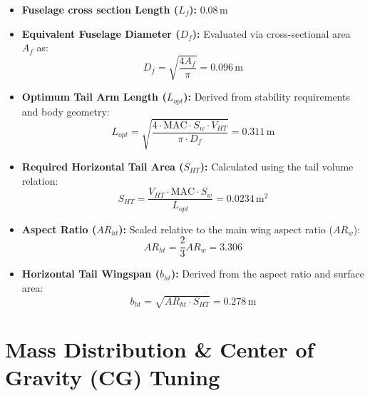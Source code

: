 \documentclass[11pt,a4paper]{article}
\begin{document}
\begin{itemize}
    \item \textbf{Fuselage cross section Length ($L_f$):} $0.08\,\text{m}$
    \item \textbf{Equivalent Fuselage Diameter ($D_f$):} Evaluated via cross-sectional area $A_f$ as:
    \begin{equation}
        D_f = \sqrt{\frac{4 A_f}{\pi}} = 0.096\,\text{m}
    \end{equation}
    \item \textbf{Optimum Tail Arm Length ($L_{opt}$):} Derived from stability requirements and body geometry:
    \begin{equation}
        L_{opt} = \sqrt{\frac{4 \cdot \text{MAC} \cdot S_w \cdot V_{HT}}{\pi \cdot D_f}} = 0.311\,\text{m}
    \end{equation}
    \item \textbf{Required Horizontal Tail Area ($S_{HT}$):} Calculated using the tail volume relation:
    \begin{equation}
        S_{HT} = \frac{V_{HT} \cdot \text{MAC} \cdot S_w}{L_{opt}} = 0.0234\,\text{m}^2
    \end{equation}
    \item \textbf{Aspect Ratio ($AR_{ht}$):} Scaled relative to the main wing aspect ratio ($AR_w$):
    \begin{equation}
        AR_{ht} = \frac{2}{3} AR_w = 3.306
    \end{equation}
    \item \textbf{Horizontal Tail Wingspan ($b_{ht}$):} Derived from the aspect ratio and surface area:
    \begin{equation}
        b_{ht} = \sqrt{AR_{ht} \cdot S_{HT}} = 0.278\,\text{m}
    \end{equation}
\end{itemize}

\section{Mass Distribution \& Center of Gravity (CG) Tuning}
\end{document}
